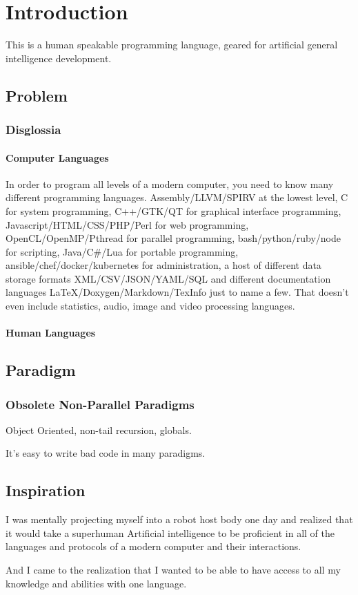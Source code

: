 \chapter{Introduction}

This is a human speakable programming language, geared for artificial general
intelligence development.

\section{Problem}
\subsection{Disglossia}

\subsubsection{Computer Languages}
In order to program all levels of a modern computer, you need to know many
different programming languages. Assembly/LLVM/SPIRV at the lowest level, C for
system programming, C++/GTK/QT for graphical interface programming,
Javascript/HTML/CSS/PHP/Perl for web programming, OpenCL/OpenMP/Pthread for parallel programming,
bash/python/ruby/node for scripting, Java/C\#/Lua for portable programming,
ansible/chef/docker/kubernetes for administration, a host of different data
storage formats XML/CSV/JSON/YAML/SQL and different documentation languages
LaTeX/Doxygen/Markdown/TexInfo just to name a few. That doesn't even include
statistics, audio, image and video processing languages.

\subsubsection{Human Languages}

\section{Paradigm}
\subsection{Obsolete Non-Parallel Paradigms}
Object Oriented, non-tail recursion, globals.

It's easy to write bad code in many paradigms.

\section{Inspiration}
I was mentally projecting myself into a robot host body one day and realized
that it would take a superhuman Artificial intelligence to be proficient in all 
of the languages and protocols of a modern computer and their interactions.

And I came to the realization that I wanted to be able to have access to all my
knowledge and abilities with one language. 




